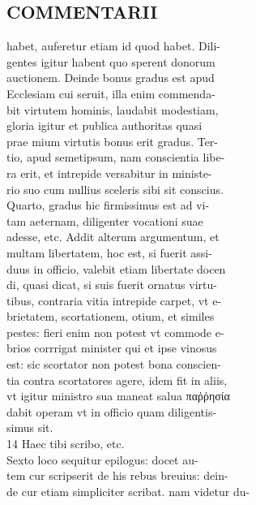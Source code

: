 \documentclass{article}
\begin{document}
\begin{pages}
\section*{COMMENTARII \\
                }habet, auferetur etiam id quod habet. Dili- \\
                gentes igitur habent quo sperent donorum \\
                auctionem. Deinde bonus gradus est apud \\
                Ecclesiam cui seruit, illa enim commenda- \\
                bit virtutem hominis, laudabit modestiam, \\
                gloria igitur et publica authoritas quasi \\
                prae mium virtutis bonus erit gradus. Ter- \\
                tio, apud semetipsum, nam conscientia libe- \\
                ra erit, et intrepide versabitur in ministe- \\
                rio suo cum nullius sceleris sibi sit conscius. \\
                Quarto, gradus hic firmissimus est ad vi- \\
                tam aeternam, diligenter vocationi suae \\
                adesse, etc. Addit alterum argumentum, et \\
                multam libertatem, hoc est, si fuerit assi- \\
                duus in officio, valebit etiam libertate docen \\
                di, quasi dicat, si suis fuerit ornatus virtu- \\
                tibus, contraria vitia intrepide carpet, vt e- \\
                brietatem, scortationem, otium, et similes \\
                pestes: fieri enim non potest vt commode e- \\
                brios corrrigat minister qui et ipse vinosus \\
                est: sic scortator non potest bona conscien- \\
                tia contra scortatores agere, idem fit in aliis, \\
                vt igitur ministro sua maneat salua παῤῥησία \\
                dabit operam vt in officio quam diligentis- \\
                simus sit. \\
                14 Haec tibi scribo, etc. \\
                Sexto loco sequitur epilogus: docet au- \\
                tem cur scripserit de his rebus breuius: dein- \\
                de cur etiam simpliciter scribat. nam videtur du- \\
                

\end{pages}
\end{document}
